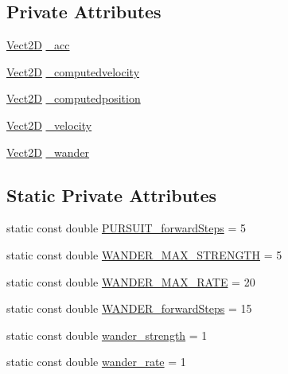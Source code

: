 \subsection*{Private Attributes}
\begin{DoxyCompactItemize}
\item 
\hyperlink{classVect2D}{Vect2D} \hyperlink{classVehicle_a6fbb45a38a758844f9a476ca720ba3f1_a6fbb45a38a758844f9a476ca720ba3f1}{\+\_\+acc}
\item 
\hyperlink{classVect2D}{Vect2D} \hyperlink{classVehicle_a6225fb68a1f2529e3f3c2d7bc47ae9e6_a6225fb68a1f2529e3f3c2d7bc47ae9e6}{\+\_\+computedvelocity}
\item 
\hyperlink{classVect2D}{Vect2D} \hyperlink{classVehicle_a81aa6e8ba6d8d1b6c6efa2d7736a5df4_a81aa6e8ba6d8d1b6c6efa2d7736a5df4}{\+\_\+computedposition}
\item 
\hyperlink{classVect2D}{Vect2D} \hyperlink{classVehicle_ac888ee5c6b81670f4cb376183b695b57_ac888ee5c6b81670f4cb376183b695b57}{\+\_\+velocity}
\item 
\hyperlink{classVect2D}{Vect2D} \hyperlink{classVehicle_ade0caf971a0a07f5ca3c50e67af95053_ade0caf971a0a07f5ca3c50e67af95053}{\+\_\+wander}
\end{DoxyCompactItemize}
\subsection*{Static Private Attributes}
\begin{DoxyCompactItemize}
\item 
static const double \hyperlink{classVehicle_a1767dabf75009d56e4f4e19712e27041_a1767dabf75009d56e4f4e19712e27041}{P\+U\+R\+S\+U\+I\+T\+\_\+forward\+Steps} = 5
\item 
static const double \hyperlink{classVehicle_a88e3c18986136f7724381cbb432b4b9e_a88e3c18986136f7724381cbb432b4b9e}{W\+A\+N\+D\+E\+R\+\_\+\+M\+A\+X\+\_\+\+S\+T\+R\+E\+N\+G\+TH} = 5
\item 
static const double \hyperlink{classVehicle_a1b8a65b38d64423f3face242225e32ff_a1b8a65b38d64423f3face242225e32ff}{W\+A\+N\+D\+E\+R\+\_\+\+M\+A\+X\+\_\+\+R\+A\+TE} = 20
\item 
static const double \hyperlink{classVehicle_af0cdca2c471fc2a8b1550901a87b6f33_af0cdca2c471fc2a8b1550901a87b6f33}{W\+A\+N\+D\+E\+R\+\_\+forward\+Steps} = 15
\item 
static const double \hyperlink{classVehicle_aa9821d59ca26c38cf6189695d92320a4_aa9821d59ca26c38cf6189695d92320a4}{wander\+\_\+strength} = 1
\item 
static const double \hyperlink{classVehicle_a2ac138ed3a9f59ccd31c04fa82cd3dfb_a2ac138ed3a9f59ccd31c04fa82cd3dfb}{wander\+\_\+rate} = 1
\end{DoxyCompactItemize}



